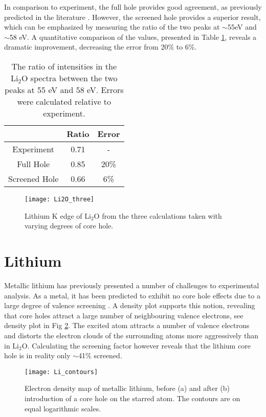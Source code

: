 In comparison to experiment, the full hole provides good agreement, as previously predicted in the literature \cite{mauchamp_ab_2006}. However, the screened hole provides a superior result, which can be emphasized by measuring the ratio of the two peaks at $\sim$55eV and $\sim$58 eV.  A quantitative comparison of the values, presented in Table \ref{ratio}, reveals a dramatic improvement, decreasing the error from 20\% to  6\%.  

\begin{table}
	\centering
	\begin{tabular}{ccc}
		& Ratio & Error \\
		\hline
		Experiment & 0.71 & -  \\
		Full Hole & 0.85 & 20\%  \\
		Screened Hole & 0.66 & 6\%  \\
		
	\end{tabular}
	\caption{The ratio of intensities in the $\mathrm{Li_2O}$ spectra between the two peaks at 55 eV and 58 eV.  Errors were calculated relative to experiment.   }
	\label{ratio}
\end{table}




\begin{figure}
	\centering
	\texttt{[image: Li2O\_three]}
	\caption{Lithium K edge of $ \mathrm{Li_2O} $ from the three calculations taken with varying degrees of core hole. }
	\label{Li2O_three}
\end{figure}

\section{Lithium}
Metallic lithium has previously presented a  number of challenges to experimental analysis. As a metal, it has been predicted to exhibit no core hole effects due to a large degree of valence screening \cite{rez_theory_2008}. A density plot supports this notion, revealing that core  holes attract a large number of neighbouring valence electrons, see density plot in Fig \ref{Li_countours}.  The excited atom attracts a number of valence electrons and  distorts the electron clouds of the surrounding atoms more aggressively than in $ \mathrm{Li_2O} $.  Calculating the screening factor however reveals that the lithium core hole is in reality only $ \sim$41\% screened. 
\\


\begin{figure}
	\centering
	\texttt{[image: Li\_contours]}
	\caption{Electron density map of metallic lithium, before (a) and after (b) introduction of a core hole on the starred atom.  The contours are on equal logarithmic scales.}
	\label{Li_countours}
\end{figure}




